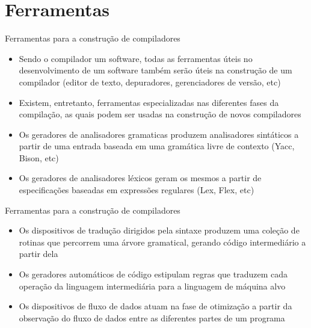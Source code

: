 \section{Ferramentas}

\begin{frame}[fragile]{Ferramentas para a construção de compiladores}

    \begin{itemize}
        \item Sendo o compilador um software, todas as ferramentas úteis no desenvolvimento de um software também serão úteis na construção de um compilador
        (editor de texto, depuradores, gerenciadores de versão, etc)
        
        \item Existem, entretanto, ferramentas especializadas nas diferentes fases da compilação, as quais podem ser usadas na construção de novos compiladores

        \item Os geradores de analisadores gramaticas produzem analisadores sintáticos a partir de uma entrada baseada em uma gramática livre de contexto (Yacc,
        Bison, etc)

        \item Os geradores de analisadores léxicos geram os mesmos a partir de especificações baseadas em expressões regulares (Lex, Flex, etc)
    \end{itemize}

\end{frame}

\begin{frame}[fragile]{Ferramentas para a construção de compiladores}

    \begin{itemize}
        \item Os dispositivos de tradução dirigidos pela sintaxe produzem uma coleção de rotinas que percorrem uma árvore gramatical, gerando código intermediário
        a partir dela 
        
        \item Os geradores automáticos de código estipulam regras que traduzem cada operação da linguagem intermediária para a linguagem de máquina alvo

        \item Os dispositivos de fluxo de dados atuam na fase de otimização a partir da observação do fluxo de dados entre as diferentes partes de um programa
    \end{itemize}

\end{frame}
